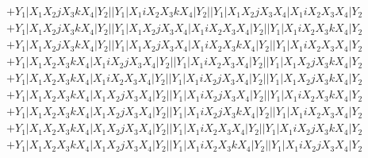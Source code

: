 \documentclass{article}[12pt]
\begin{document}
\begin{align*}
 & +Y_1|X_1X_2jX_3kX_4|Y_2||Y_1|X_1iX_2X_3kX_4|Y_2||Y_1|X_1X_2jX_3X_4|X_1iX_2X_3X_4|Y_2\\ 
 & +Y_1|X_1X_2jX_3kX_4|Y_2||Y_1|X_1X_2jX_3X_4|X_1iX_2X_3X_4|Y_2||Y_1|X_1iX_2X_3kX_4|Y_2\\ 
 & +Y_1|X_1X_2jX_3kX_4|Y_2||Y_1|X_1X_2jX_3X_4|X_1iX_2X_3kX_4|Y_2||Y_1|X_1iX_2X_3X_4|Y_2\\ 
 & +Y_1|X_1X_2X_3kX_4|X_1iX_2jX_3X_4|Y_2||Y_1|X_1iX_2X_3X_4|Y_2||Y_1|X_1X_2jX_3kX_4|Y_2\\ 
 & +Y_1|X_1X_2X_3kX_4|X_1iX_2X_3X_4|Y_2||Y_1|X_1iX_2jX_3X_4|Y_2||Y_1|X_1X_2jX_3kX_4|Y_2\\ 
 & +Y_1|X_1X_2X_3kX_4|X_1X_2jX_3X_4|Y_2||Y_1|X_1iX_2jX_3X_4|Y_2||Y_1|X_1iX_2X_3kX_4|Y_2\\ 
 & +Y_1|X_1X_2X_3kX_4|X_1X_2jX_3X_4|Y_2||Y_1|X_1iX_2jX_3kX_4|Y_2||Y_1|X_1iX_2X_3X_4|Y_2\\ 
 & +Y_1|X_1X_2X_3kX_4|X_1X_2jX_3X_4|Y_2||Y_1|X_1iX_2X_3X_4|Y_2||Y_1|X_1iX_2jX_3kX_4|Y_2\\ 
 & +Y_1|X_1X_2X_3kX_4|X_1X_2jX_3X_4|Y_2||Y_1|X_1iX_2X_3kX_4|Y_2||Y_1|X_1iX_2jX_3X_4|Y_2\end{align*}
\end{document}
